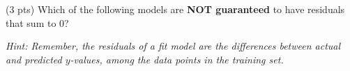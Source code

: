 \documentclass[twoside,12pt]{article}
\begin{document}
\begin{probset}
\begin{prob}[(8 pts)]
\begin{subprobset}


\begin{subprob}(3 pts) Which of the following models are \textbf{NOT guaranteed} to have residuals that sum to 0?

\textit{Hint: Remember, the residuals of a fit model are the differences between actual and predicted $y$-values, among the data points in the training set.}






\end{subprob}

\end{subprobset}


\end{prob}
\end{probset}
\end{document}
